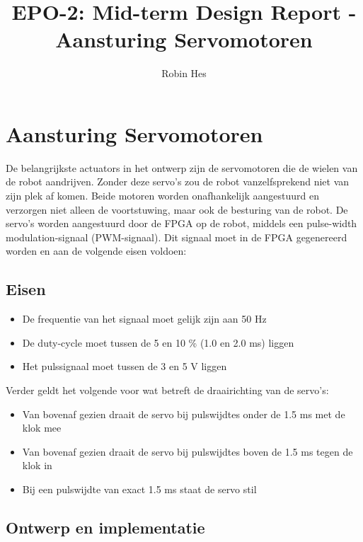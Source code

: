\documentclass{report}
\title{EPO-2: Mid-term Design Report - Aansturing Servomotoren}
\author{Robin Hes}
\begin{document}
\chapter{Aansturing Servomotoren}
\label{ch:servo}

De belangrijkste actuators in het ontwerp zijn de servomotoren die de wielen van de robot aandrijven. Zonder deze servo's zou de robot vanzelfsprekend niet van zijn plek af komen. Beide motoren worden onafhankelijk aangestuurd en verzorgen niet alleen de voortstuwing, maar ook de besturing van de robot. De servo's worden aangestuurd door de FPGA op de robot, middels een pulse-width modulation-signaal (PWM-signaal). Dit signaal moet in de FPGA gegenereerd worden en aan de volgende eisen voldoen:

\section{Eisen}
\label{sec:servo-eisen}

\begin{itemize}
	\item De frequentie van het signaal moet gelijk zijn aan 50 Hz
	\item De duty-cycle moet tussen de 5 en 10 \% (1.0 en 2.0 ms) liggen
	\item Het pulssignaal moet tussen de 3 en 5 V liggen
\end{itemize}

\noindent
Verder geldt het volgende voor wat betreft de draairichting van de servo's:

\begin{itemize}
	\item Van bovenaf gezien draait de servo bij pulswijdtes onder de 1.5 ms met de klok mee
	\item Van bovenaf gezien draait de servo bij pulswijdtes boven de 1.5 ms tegen de klok in
	\item Bij een pulswijdte van exact 1.5 ms staat de servo stil
\end{itemize}

\section{Ontwerp en implementatie}
\label{sec:servo-design}
\end{document}
